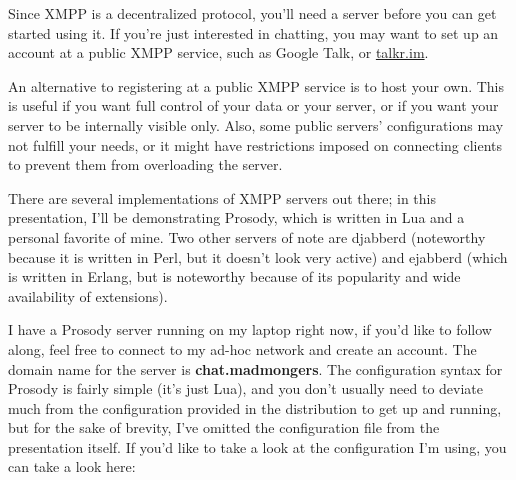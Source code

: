 Since XMPP is a decentralized protocol, you'll need a server before you can get started using it.
If you're just interested in chatting, you may want to set up an account at a public XMPP service,
such as Google Talk, or \url{talkr.im}.

\pause
An alternative to registering at a public XMPP service is to host your own.  This is useful if you want
full control of your data or your server, or if you want your server to be internally visible only.  Also,
some public servers' configurations may not fulfill your needs, or it might have restrictions imposed on
connecting clients to prevent them from overloading the server.

\pause
There are several implementations of XMPP servers out there; in this presentation, I'll be demonstrating Prosody,
which is written in Lua and a personal favorite of mine.  Two other servers of note are djabberd (noteworthy
because it is written in Perl, but it doesn't look very active) and ejabberd (which is written in Erlang, but is
noteworthy because of its popularity and wide availability of extensions).

\pause
I have a Prosody server running on my laptop right now, if you'd like to follow along, feel free to connect to my ad-hoc
network and create an account.  The domain name for the server is \textbf{chat.madmongers}.  The configuration syntax for Prosody is
fairly simple (it's just Lua), and you don't usually need to deviate much from the configuration provided in the distribution to
get up and running, but for the sake of brevity, I've omitted the configuration file from the presentation itself.  If you'd
like to take a look at the configuration I'm using, you can take a look here:

\pause
{}
